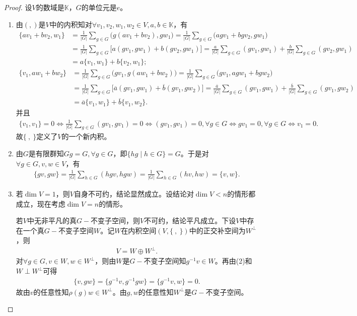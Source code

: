 \documentclass[../../main.tex]{subfiles}%
\begin{document}
\begin{proof}

设$V$的数域是$\mathbb{K}$，$G$的单位元是$e$。
\begin{enumerate}[(1)]
\item 由$(,)$是$V$中的内积知对$\forall v_1,v_2,w_1,w_2\in V,a,b\in \mathbb{K}$，有
\begin{align*}
\{av_1+bv_2,w_1\}&=\frac{1}{|G|}\sum\limits_{g\in G}\bigl(g(av_1+bv_2),gw_1\bigr)=\frac{1}{|G|}\sum\limits_{g\in G}\bigl(agv_1+bgv_2,gw_1\bigr)\\
&=\frac{1}{|G|}\sum\limits_{g\in G}\bigl[a(gv_1,gw_1)+b(gv_2,gw_1)\bigr]=\frac{a}{|G|}\sum\limits_{g\in G}(gv_1,gw_1)+\frac{b}{|G|}\sum\limits_{g\in G}(gv_2,gw_1)\\
&=a\{v_1,w_1\}+b\{v_2,w_1\};
\end{align*}
\begin{align*}
\{v_1,aw_1+bw_2\}&=\frac{1}{|G|}\sum\limits_{g\in G}\bigl(gv_1,g(aw_1+bw_2)\bigr)=\frac{1}{|G|}\sum\limits_{g\in G}\bigl(gv_1,agw_1+bgw_2\bigr)\\
&=\frac{1}{|G|}\sum\limits_{g\in G}\bigl[\overline{a}(gv_1,gw_1)+\overline{b}(gv_1,gw_2)\bigr]=\frac{\overline{a}}{|G|}\sum\limits_{g\in G}(gv_1,gw_1)+\frac{\overline{b}}{|G|}\sum\limits_{g\in G}(gv_1,gw_2)\\
&=\overline{a}\{v_1,w_1\}+\overline{b}\{v_1,w_2\}.
\end{align*}
并且
\begin{align*}
\{v_1,v_1\}=0\iff \frac{1}{|G|}\sum\limits_{g\in G}(gv_1,gv_1)=0\iff (gv_1,gv_1)=0,\forall g\in G\iff gv_1=0,\forall g\in G\iff v_1=0.
\end{align*}
故$\{\ ,\ \}$定义了$V$的一个新内积。

\item 由$G$是有限群知$Gg=G,\forall g\in G$，即$\{hg\mid h\in G\}=G$。于是对$\forall g\in G,v,w\in V$，有
\begin{align*}
\{gv,gw\}=\frac{1}{|G|}\sum\limits_{h\in G}(hgv,hgw)=\frac{1}{|G|}\sum\limits_{h\in G}(hv,hw)=\{v,w\}.
\end{align*}

\item 若$\dim V=1$，则$V$自身不可约，结论显然成立。设结论对$\dim V<n$的情形都成立，现在考虑$\dim V=n$的情形。

若$V$中无非平凡的真$G-$不变子空间，则$V$不可约，结论平凡成立。下设$V$中存在一个真$G-$不变子空间$W$。记$W$在内积空间$(V,\{\ ,\ \})$中的正交补空间为$W^\perp$，则
\begin{align}\label{eq:::::--OIOFwwff31-1}
V=W\oplus W^\perp.
\end{align}
对$\forall g\in G,v\in W,w\in W^\perp$，则由$W$是$G-$不变子空间知$g^{-1}v\in W$。再由(2)和$W\perp W^\perp$可得
\begin{align*}
\{v,gw\}=\{g^{-1}v,g^{-1}gw\}=\{g^{-1}v,w\}=0.
\end{align*}
故由$v$的任意性知$\rho(g)w\in W^\perp$。由$g,w$的任意性知$W^\perp$是$G-$不变子空间。


\end{enumerate}
\end{proof}
\end{document}
